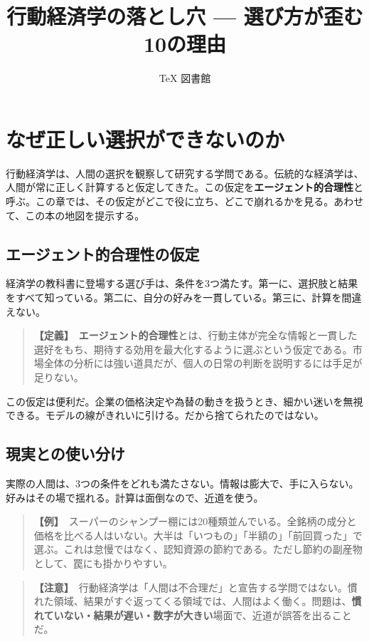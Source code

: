 \documentclass{article}
\title{行動経済学の落とし穴 — 選び方が歪む10の理由}
\author{TeX 図書館}
\begin{document}
\section{なぜ正しい選択ができないのか}

行動経済学は、人間の選択を観察して研究する学問である。伝統的な経済学は、人間が常に正しく計算すると仮定してきた。この仮定を\textbf{エージェント的合理性}と呼ぶ。この章では、その仮定がどこで役に立ち、どこで崩れるかを見る。あわせて、この本の地図を提示する。

\subsection{エージェント的合理性の仮定}

経済学の教科書に登場する選び手は、条件を3つ満たす。第一に、選択肢と結果をすべて知っている。第二に、自分の好みを一貫している。第三に、計算を間違えない。

\begin{quote}
\textbf{【定義】}\ \textbf{エージェント的合理性}とは、行動主体が完全な情報と一貫した選好をもち、期待する効用を最大化するように選ぶという仮定である。市場全体の分析には強い道具だが、個人の日常の判断を説明するには手足が足りない。
\end{quote}

この仮定は便利だ。企業の価格決定や為替の動きを扱うとき、細かい迷いを無視できる。モデルの線がきれいに引ける。だから捨てられたのではない。

\subsection{現実との使い分け}

実際の人間は、3つの条件をどれも満たさない。情報は膨大で、手に入らない。好みはその場で揺れる。計算は面倒なので、近道を使う。

\begin{quote}
\textbf{【例】}\ スーパーのシャンプー棚には20種類並んでいる。全銘柄の成分と価格を比べる人はいない。大半は「いつもの」「半額の」「前回買った」で選ぶ。これは怠慢ではなく、認知資源の節約である。ただし節約の副産物として、罠にも掛かりやすい。
\end{quote}

\begin{quote}
\textbf{【注意】}\ 行動経済学は「人間は不合理だ」と宣告する学問ではない。慣れた領域、結果がすぐ返ってくる領域では、人間はよく働く。問題は、\textbf{慣れていない・結果が遅い・数字が大きい}場面で、近道が誤答を出ることだ。
\end{quote}
\end{document}

